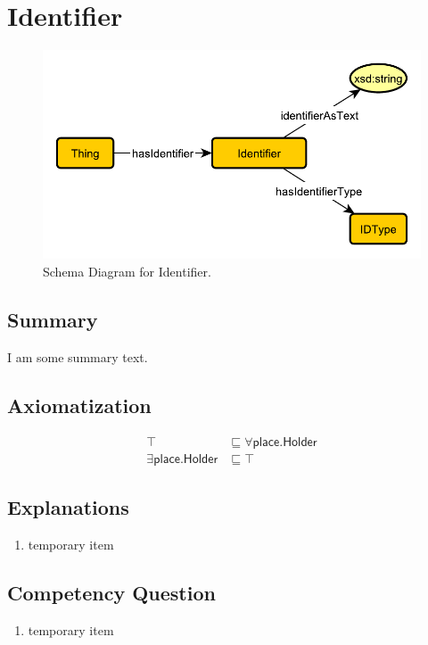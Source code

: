 \section{Identifier}
\label{sec:Identifier}
\begin{figure}[h!]
\begin{center}
\includegraphics[width=.4\textwidth]{figures/identifier}
\end{center}
\caption{Schema Diagram for Identifier.}
\label{fig:Identifier}
\end{figure}
\subsection{Summary}
\label{sum:Identifier}
I am some summary text.

\subsection{Axiomatization}
\label{axs:Identifier}
\begin{align}
\top &\sqsubseteq \forall\textsf{place.Holder} \\ 
\exists\textsf{place.Holder} &\sqsubseteq \top 
\end{align}

\subsection{Explanations}
\label{exp:Identifier}
\begin{enumerate}
\item temporary item
\end{enumerate}

\subsection{Competency Question}
\label{cqs:Identifier}
\begin{enumerate}[CQ1.]
\item temporary item
\end{enumerate}

\newpage
